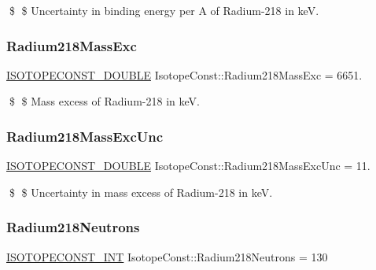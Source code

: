 \$ \$ Uncertainty in binding energy per A of Radium-\/218 in keV. \mbox{\label{group___isotope_const-_radium-_ra218_gab3b3e6fd7c126c8f7a1de83d2bc8dcac}} 
\subsubsection{\texorpdfstring{Radium218\+Mass\+Exc}{Radium218MassExc}}
{\footnotesize\ttfamily \mbox{\hyperlink{group___isotope_const-_macros_ga8f45a7272ce02c0b4c65c44636ed719a}{I\+S\+O\+T\+O\+P\+E\+C\+O\+N\+S\+T\+\_\+\+D\+O\+U\+B\+LE}} Isotope\+Const\+::\+Radium218\+Mass\+Exc = 6651.}

\$ \$ Mass excess of Radium-\/218 in keV. \mbox{\label{group___isotope_const-_radium-_ra218_gaf925629ac900b5d4f6fb1984c3b4c662}} 
\subsubsection{\texorpdfstring{Radium218\+Mass\+Exc\+Unc}{Radium218MassExcUnc}}
{\footnotesize\ttfamily \mbox{\hyperlink{group___isotope_const-_macros_ga8f45a7272ce02c0b4c65c44636ed719a}{I\+S\+O\+T\+O\+P\+E\+C\+O\+N\+S\+T\+\_\+\+D\+O\+U\+B\+LE}} Isotope\+Const\+::\+Radium218\+Mass\+Exc\+Unc = 11.}

\$ \$ Uncertainty in mass excess of Radium-\/218 in keV. \mbox{\label{group___isotope_const-_radium-_ra218_gad692e8605447178343acfaf653dd20a9}} 
\subsubsection{\texorpdfstring{Radium218\+Neutrons}{Radium218Neutrons}}
{\footnotesize\ttfamily \mbox{\hyperlink{group___isotope_const-_macros_ga5f18360b3e99483a35c32d789e62621c}{I\+S\+O\+T\+O\+P\+E\+C\+O\+N\+S\+T\+\_\+\+I\+NT}} Isotope\+Const\+::\+Radium218\+Neutrons = 130}

